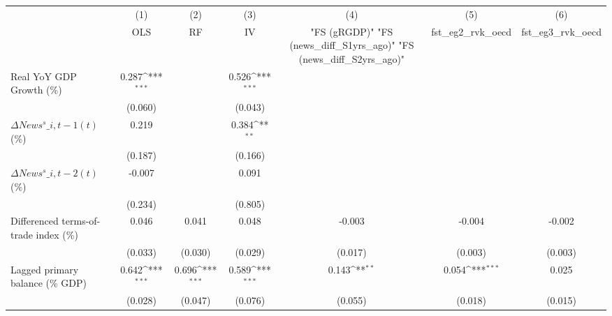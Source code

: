 {
\def\sym#1{\ifmmode^{#1}\else\(^{#1}\)\fi}
\begin{tabular}{l*{6}{c}}
\toprule
                    &\multicolumn{1}{c}{(1)}&\multicolumn{1}{c}{(2)}&\multicolumn{1}{c}{(3)}&\multicolumn{1}{c}{(4)}&\multicolumn{1}{c}{(5)}&\multicolumn{1}{c}{(6)}\\
                    &\multicolumn{1}{c}{OLS}&\multicolumn{1}{c}{RF}&\multicolumn{1}{c}{IV}&\multicolumn{1}{c}{ "FS (gRGDP)"  "FS (news\_diff\_S1yrs\_ago)"  "FS (news\_diff\_S2yrs\_ago)" }&\multicolumn{1}{c}{fst\_eg2\_rvk\_oecd}&\multicolumn{1}{c}{fst\_eg3\_rvk\_oecd}\\
\midrule
Real YoY GDP Growth (\%)&       0.287\sym{***}&                     &       0.526\sym{***}&                     &                     &                     \\
                    &     (0.060)         &                     &     (0.043)         &                     &                     &                     \\
\addlinespace
$ \Delta News^s\_{i,t-1}(t)$ (\%)&       0.219         &                     &       0.384\sym{**} &                     &                     &                     \\
                    &     (0.187)         &                     &     (0.166)         &                     &                     &                     \\
\addlinespace
$ \Delta News^s\_{i,t-2}(t)$ (\%)&      -0.007         &                     &       0.091         &                     &                     &                     \\
                    &     (0.234)         &                     &     (0.805)         &                     &                     &                     \\
\addlinespace
Differenced terms-of-trade index (\%)&       0.046         &       0.041         &       0.048         &      -0.003         &      -0.004         &      -0.002         \\
                    &     (0.033)         &     (0.030)         &     (0.029)         &     (0.017)         &     (0.003)         &     (0.003)         \\
\addlinespace
Lagged primary balance (\% GDP)&       0.642\sym{***}&       0.696\sym{***}&       0.589\sym{***}&       0.143\sym{**} &       0.054\sym{***}&       0.025         \\
                    &     (0.028)         &     (0.047)         &     (0.076)         &     (0.055)         &     (0.018)         &     (0.015)         \\

\end{tabular}}
